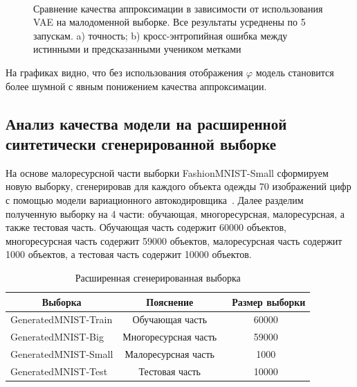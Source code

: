 \begin{figure}[h!t]\center
{}
\\
\caption{Сравнение качества аппроксимации в зависимости от использования VAE на малодоменной выборке. Все результаты усреднены по 5 запускам. a) точность; b) кросс-энтропийная ошибка между истинными и предсказанными учеником метками}
\end{figure}

На графиках видно, что без использования отображения $\varphi$ модель становится более шумной с явным понижением качества аппроксимации.

\newpage
\subsection{Анализ качества модели на расширенной синтетически сгенерированной выборке}
На основе малоресурсной части выборки FashionMNIST-Small сформируем новую выборку, сгенерировав для каждого объекта одежды 70 изображений цифр с помощью модели вариационного автокодировщика~\cite{VAE}. Далее разделим полученную выборку на 4 части: обучающая, многоресурсная, малоресурсная, а также тестовая часть. Обучающая часть содержит 60000 объектов, многоресурсная часть содержит 59000 объектов, малоресурсная часть содержит 1000 объектов, а тестовая часть содержит 10000 объектов.
\begin{table}[h!t]
\begin{center}
\caption{Расширенная сгенерированная выборка}
\label{table_1}
\begin{tabular}{|c|c|c|}
\hline
	Выборка & Пояснение &\ Размер выборки\\
	\hline
	\multicolumn{1}{|l|}{GeneratedMNIST-Train}
	& Обучающая часть& 60000\\
	\hline
	\multicolumn{1}{|l|}{GeneratedMNIST-Big}
	& Многоресурсная часть& 59000\\
	\hline
	\multicolumn{1}{|l|}{GeneratedMNIST-Small}
	& Малоресурсная часть& 1000\\
	\hline
	\multicolumn{1}{|l|}{GeneratedMNIST-Test}
	& Тестовая часть& 10000\\

\hline

\end{tabular}
\end{center}
\end{table}

